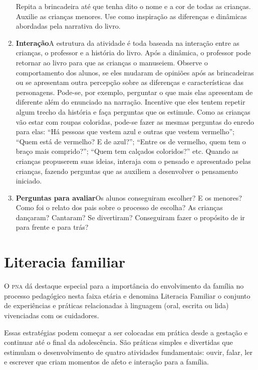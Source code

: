 \documentclass[11pt]{extarticle}
\begin{document}
\begin{enumerate}
Repita a brincadeira até que tenha dito o nome e a cor de todas as crianças. Auxilie as crianças menores. Use como inspiração as diferenças e dinâmicas abordadas pela narrativa do livro.

\item \textbf{Interação}\quad A estrutura da atividade é toda baseada na interação entre as crianças, o professor e a história do livro. Após a dinâmica, o professor pode retornar ao livro para que as crianças o manuseiem. Observe o comportamento dos alunos, se eles mudaram de opiniões após as brincadeiras ou se apresentam outra percepção sobre as diferenças e características das personagens. Pode-se, por exemplo, perguntar o que mais elas apresentam de diferente além do enunciado na narração.
 Incentive que eles tentem repetir algum trecho da história e
faça perguntas que os estimule. Como as crianças vão estar com roupas coloridas, pode-se fazer as mesmas perguntas do enredo para elas: ``Há pessoas que vestem azul e outras que vestem vermelho''; ``Quem está de vermelho? E de azul?''; ``Entre os de vermelho, quem tem o braço mais comprido?''; ``Quem tem calçados coloridos?'' etc.
Quando as crianças propuserem suas ideias, interaja com o pensado e apresentado pelas crianças, fazendo perguntas que as auxiliem a desenvolver o pensamento iniciado.

\item \textbf{Perguntas para avaliar}\quad Os alunos conseguiram escolher? E os menores?  Como foi o relato dos pais sobre o processo de escolha? As crianças dançaram? Cantaram? Se divertiram? Conseguiram fazer o propósito de ir para frente e para trás? 
\end{enumerate}


\section{Literacia familiar}
O \textsc{pna} dá destaque especial para a importância do envolvimento da família 
no processo pedagógico nesta faixa etária e denomina Literacia Familiar o conjunto 
de experiências e práticas relacionadas à linguagem (oral, escrita ou lida) vivenciadas 
com os cuidadores. 

Essas estratégias podem começar a ser colocadas em prática desde a 
gestação e continuar até o final da adolescência. São práticas simples e divertidas 
que estimulam o desenvolvimento de quatro atividades fundamentais: ouvir, falar, 
ler e escrever que criam momentos de afeto e interação para a família. 
\end{document}
